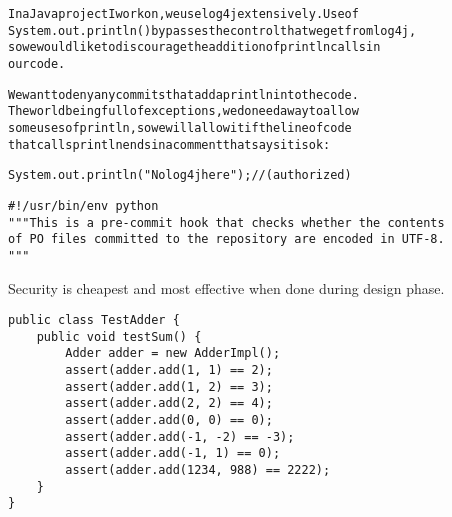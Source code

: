 \documentclass[Screen16to9,17pt]{foils}
\begin{document}

\begin{alltt}
In a Java project I work on, we use log4j extensively.  Use of
System.out.println() bypasses the control that we get from log4j,
so we would like to discourage the addition of println calls in
our code.

We want to deny any commits that add a println into the code.
The world being full of exceptions, we do need a way to allow
some uses of println, so we will allow it if the line of code
that calls println ends in a comment that says it is ok:

   System.out.println("No log4j here"); // (authorized)
\end{alltt}

{\small {}}



\begin{verbatim}
#!/usr/bin/env python
"""This is a pre-commit hook that checks whether the contents
of PO files committed to the repository are encoded in UTF-8.
"""
\end{verbatim}

{\small {}}


\centerline{Security is cheapest and most effective when done during design phase.}







\begin{verbatim}
public class TestAdder {
    public void testSum() {
        Adder adder = new AdderImpl();
        assert(adder.add(1, 1) == 2);
        assert(adder.add(1, 2) == 3);
        assert(adder.add(2, 2) == 4);
        assert(adder.add(0, 0) == 0);
        assert(adder.add(-1, -2) == -3);
        assert(adder.add(-1, 1) == 0);
        assert(adder.add(1234, 988) == 2222);
    }
}
\end{verbatim}
\end{document}
